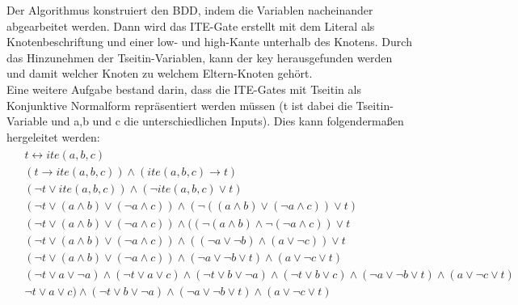 \documentclass[a4,abstract=on]{scrartcl}
\begin{document}
Der Algorithmus konstruiert den BDD, indem die Variablen nacheinander abgearbeitet werden. Dann wird das ITE-Gate erstellt mit dem Literal als Knotenbeschriftung und einer low- und high-Kante unterhalb des Knotens. Durch das Hinzunehmen der Tseitin-Variablen, kann der key herausgefunden werden und damit welcher Knoten zu welchem Eltern-Knoten gehört.\\
Eine weitere Aufgabe bestand darin, dass die ITE-Gates mit Tseitin als Konjunktive Normalform repräsentiert werden müssen (t ist dabei die Tseitin-Variable und a,b und c die unterschiedlichen Inputs). Dies kann folgendermaßen hergeleitet werden:\\
\begin{align*}
\begin{aligned}
&t \leftrightarrow ite(a,b,c)\\
&(t \rightarrow ite (a,b,c)) \wedge (ite (a,b,c) \rightarrow t)\\
&(\neg t \vee ite(a,b,c)) \wedge (\neg ite(a,b,c) \vee t)\\
&(\neg t \vee (a \wedge b) \vee (\neg a \wedge c)) \wedge (\neg((a \wedge b) \vee (\neg a \wedge c)) \vee t)\\
&(\neg t \vee (a \wedge b) \vee (\neg a \wedge c)) \wedge ((\neg(a \wedge b) \wedge \neg (\neg a \wedge c)) \vee t\\
&(\neg t \vee (a \wedge b) \vee (\neg a \wedge c)) \wedge ((\neg a \vee \neg b) \wedge (a \vee \neg c)) \vee t\\
&(\neg t \vee (a \wedge b) \vee (\neg a \wedge c)) \wedge (\neg a \vee \neg b \vee t) \wedge (a \vee \neg c \vee t)\\
&(\neg t \vee a \vee \neg a) \wedge (\neg t \vee a\vee c) \wedge (\neg t \vee b \vee \neg a) \wedge (\neg t \vee b \vee c) \wedge (\neg a \vee \neg b \vee t) \wedge (a \vee \neg c \vee t)\\
&\neg t \vee a\vee c) \wedge (\neg t \vee b \vee \neg a) \wedge (\neg a \vee \neg b \vee t) \wedge (a \vee \neg c \vee t)
\end{aligned}
\end{align*}

\end{document}
